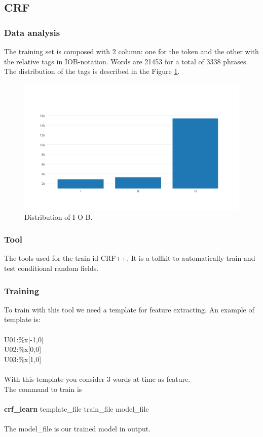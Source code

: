 \documentclass[a4paper,8pt,oneside]{article}
\begin{document}
	\subsection{CRF}
		\subsubsection{Data analysis}
			The training set is composed with 2 column: one for the token and the other with the relative tags in IOB-notation. Words are 21453 for a total of 3338 phrases. The distribution of the tags is described in the Figure \ref{crf-dist}.
			\begin{figure}[h!]
			  \centering
			    \includegraphics[width=1.0\textwidth]{img/crf-dist}
			  \caption{Distribution of I O B.}
			  \label{crf-dist}
			\end{figure}
		\subsubsection{Tool}
			The tools used for the train id CRF++. It is a tollkit to automatically train and test conditional random fields.
		\subsubsection{Training}
			To train with this tool we need a template for feature extracting.
			An example of template is: \\ \\
			U01:\%x[-1,0] \\
			U02:\%x[0,0] \\
			U03:\%x[1,0] \\ \\
			With this template you consider 3 words at time as feature. \\
			The command to train is \\\\
			\textbf{crf\_learn} template\_file train\_file model\_file\\\\
			The model\_file is our trained model in output.
\end{document}
